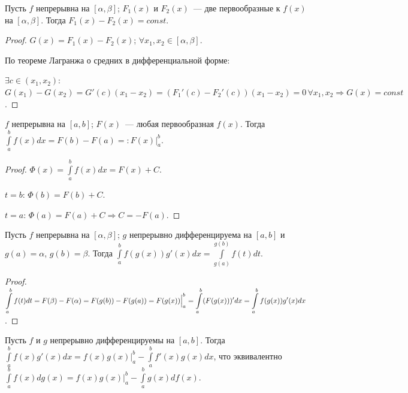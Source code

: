 \documentclass[12pt]{article}
\newcommand{\dint}{\displaystyle\int}
\begin{document}
	\begin{lemma}
		Пусть $f$ непрерывна на $[\alpha, \beta]$; $F_1(x)$ и $F_2(x)$~--- две первообразные к $f(x)$ на $[\alpha, \beta]$. Тогда $F_1(x) - F_2(x) = const$.
	\end{lemma}
	
	\begin{proof}
		$G(x) = F_1(x) - F_2(x)$; $\forall x_1, x_2 \in [\alpha, \beta]$.
		
		По теореме Лагранжа о средних в дифференциальной форме:
		
		$\exists c \in (x_1, x_2)$: $G(x_1) - G(x_2) = G'(c)(x_1 - x_2) = (F_1'(c) - F_2'(c))(x_1 - x_2) = 0 \, \forall x_1, x_2 \Rightarrow G(x) = const$.
	\end{proof}
	
	\begin{theorem}
		$f$ непрерывна на $[a, b]$; $F(x)$~--- любая первообразная $f(x)$. Тогда $\dint\limits_a^b f(x) dx = F(b) - F(a) =: F(x) \Bigr|_a^b$.
	\end{theorem}
	
	\begin{proof}
		$\Phi (x) = \dint\limits_a^b f(x) dx = F(x) + C$.
		
		$t = b$: $\Phi (b) = F(b) + C$.
		
		$t = a$: $\Phi (a) = F(a) + C \Rightarrow C = -F(a)$.
	\end{proof}
	
	\begin{theorem}
		Пусть $f$ непрерывна на $[\alpha, \beta]$; $g$ непрерывно дифференцируема на $[a, b]$ и $g(a) = \alpha$, $g(b) = \beta$. Тогда $\dint\limits_a^b f(g(x)) g'(x) dx = \dint\limits_{g(a)}^{g(b)} f(t) dt$.
	\end{theorem}
	
	\begin{proof}
		$\dint\limits_a^b f(t) dt = F(\beta) - F(\alpha) = F(g(b)) - F(g(a)) = F(g(x)) \Bigr|_a^b = \dint\limits_a^b (F(g(x)))' dx\\
		= \dint\limits_a^b f(g(x)) g'(x) dx$.
	\end{proof}
	
	\begin{theorem}
		Пусть $f$ и $g$ непрерывно дифференцируемы на $[a, b]$. Тогда $\dint\limits_a^b f(x) g'(x) dx = f(x) g(x) \Bigr|_a^b - \dint\limits_a^b f'(x) g(x) dx$, что эквивалентно $\dint\limits_a^b f(x) d g(x) = f(x) g(x) \Bigr|_a^b - \dint\limits_a^b g(x) d f(x)$.
	\end{theorem}
	
\end{document}
